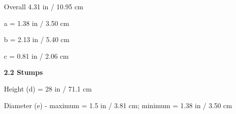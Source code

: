 \documentclass[12pt]{article}
\begin{document}
\vspace{\baselineskip}
\begin{adjustwidth}{0.49in}{0.0in}
{\fontsize{9pt}{10.8pt}\selectfont Overall 4.31 in / 10.95 cm\par}\par

\end{adjustwidth}


\vspace{\baselineskip}
\begin{adjustwidth}{0.49in}{0.0in}
{\fontsize{9pt}{10.8pt}\selectfont a = 1.38 in / 3.50 cm\par}\par

\end{adjustwidth}


\vspace{\baselineskip}
\begin{adjustwidth}{0.49in}{0.0in}
{\fontsize{9pt}{10.8pt}\selectfont b = 2.13 in / 5.40 cm\par}\par

\end{adjustwidth}


\vspace{\baselineskip}
\begin{adjustwidth}{0.49in}{0.0in}
{\fontsize{9pt}{10.8pt}\selectfont c = 0.81 in / 2.06 cm\par}\par

\end{adjustwidth}


\vspace{\baselineskip}
{\fontsize{11pt}{13.2pt}\selectfont \textbf{2.2 \tabto{0.47in} Stumps}\par}\par


\vspace{\baselineskip}
\begin{adjustwidth}{0.49in}{0.0in}
{\fontsize{9pt}{10.8pt}\selectfont Height (d) = 28 in / 71.1 cm\par}\par

\end{adjustwidth}


\vspace{\baselineskip}
\begin{adjustwidth}{0.49in}{0.0in}
{\fontsize{9pt}{10.8pt}\selectfont Diameter (e) - maximum = 1.5 in / 3.81 cm; minimum = 1.38 in / 3.50 cm\par}\par

\end{adjustwidth}
\end{document}
